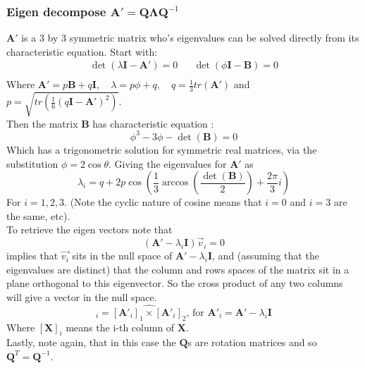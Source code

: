 \documentclass{article}
\def\mat#1{\mathbf{#1}}
\begin{document}
\subsubsection{Eigen decompose $\mat{A'} = \mat{Q}\mat{\Lambda}\mat{Q}^{-1}$}
$\mat{A'}$ is a 3 by 3 symmetric matrix who's eigenvalues can be
solved directly from its characteristic equation. Start with:
\begin{equation}
\begin{matrix}
\det\left( \lambda \mat{I} - \mat{A'} \right) = 0 & &
\det\left( \phi \mat{I} - \mat{B} \right) = 0\\
\end{matrix}
\end{equation}
Where $\mat{A'} = p\mat{B} + q\mat{I}$, ~ $\lambda = p \phi + q$, ~ $q = \frac{1}{3}tr(\mat{A'})$ and 
$p = \sqrt{ tr \left( \frac{1}{6} (q\mat{I}-\mat{A'})^2 \right) } $.\\
Then the matrix $\mat{B}$ has characteristic equation :
\begin{equation}
\phi^3 - 3 \phi - \det(\mat{B}) = 0
\end{equation}
Which has a trigonometric solution for symmetric real matrices, via the 
substitution $\phi = 2 \cos{ \theta }$. Giving the eigenvalues for $\mat{A'}$ as
\begin{equation}
\lambda_{i} = q + 2 p \cos{(\frac{1}{3}\arccos{ \left( \frac{ \det(\mat{B})}{2} \right) + \frac{2\pi}{3}i })}
\end{equation}
For $i=1,2,3$. (Note the cyclic nature of cosine means that $i=0$ and $i=3$ are the same, etc).
\\
To retrieve the eigen vectors note that 
\begin{equation}
(\mat{A'}-\lambda_i\mat{I})\vec{v}_i = 0
\end{equation}
implies that $\vec{v_i}$ sits in the null space of
$\mat{A'}-\lambda_i\mat{I}$, and (assuming that the eigenvalues are
distinct) that the column and rows spaces of the matrix sit in a
plane orthogonal to this eigenvector. So the cross product of any two
columns will give a vector in the null space.
\begin{equation}
[\mat{Q}]_i = \widehat{ [\mat{A'}_i]_1 \times  [\mat{A'}_i]_2 }\text{, for } \mat{A'}_i = \mat{A'} - \lambda_i\mat{I}
\end{equation}
Where $[\mat{X}]_i$ means the i-th column of $\mat{X}$.\\
Lastly, note again, that in this case the $\mat{Q}$s are rotation matrices and so $\mat{Q}^T = \mat{Q}^{-1}$.
\end{document}
